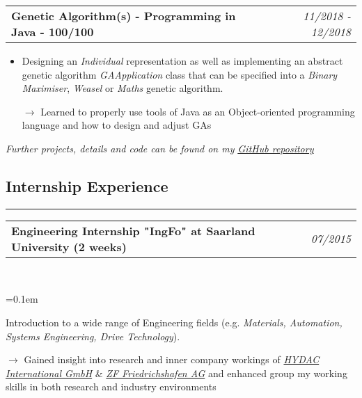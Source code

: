 \documentclass[10pt,letterpaper]{article}
\makeatletter
\newcommand{\headerrow}[2]
{\begin{tabular*}{\linewidth}{l@{\extracolsep{\fill}}r}
	#1 &
	#2 \\
\end{tabular*}}
\makeatother
\begin{document}
\noindent
\headerrow{\textbf{Genetic Algorithm(s) - Programming in Java - 100/100}}{\emph{11/2018 - 12/2018}}
\vspace{-1.6em}
\begin{itemize}
    \setlength\itemsep{0em}
    \item Designing an \emph{Individual} representation as well as implementing an abstract genetic algorithm \emph{GAApplication} class that can be specified into a \emph{Binary Maximiser}, \emph{Weasel} or \emph{Maths} genetic algorithm.
    \item[$\rightarrow$] Learned to properly use tools of Java as an Object-oriented programming language and how to design and adjust GAs
\end{itemize}
\vspace{0.4em}
\emph{Further projects, details and code can be found on my \href{https://github.com/j0ner0n}{\underline{GitHub repository}}}

\subsection*{Internship Experience}
\hrule
\vspace{0.4em}

\noindent
\headerrow{\textbf{Engineering Internship "IngFo" at Saarland University (2 weeks)}}{\emph{07/2015}}
\\
\vspace{-1.6em}
\begin{itemize*}
    \parskip=0.1em
    \item Introduction to a wide range of Engineering fields (e.g. \emph{Materials, Automation, Systems Engineering, Drive Technology}).
	\item[$\rightarrow$] Gained insight into research and inner company workings of \href{https://www.hydac.com/uk-en/start.html}{\emph{HYDAC International GmbH}} \& \href{https://www.zf.com/mobile/en/homepage/homepage.html}{\emph{ZF Friedrichshafen AG}} and enhanced group my working skills in both research and industry environments
\end{itemize*}
\end{document}
